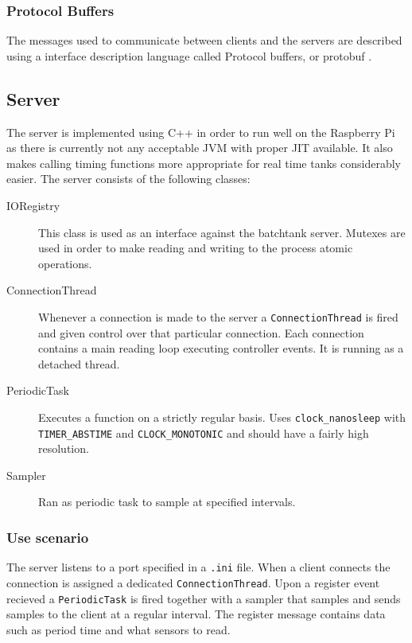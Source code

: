 \documentclass{article}
\begin{document}
\subsubsection{Protocol Buffers}
The messages used to communicate between clients and the servers are
described using a interface description language called Protocol
buffers, or protobuf \cite{protobuf}.


\subsection{Server}
The server is implemented using C++ in order to run well on the Raspberry Pi as
there is currently not any acceptable JVM with proper JIT available. It
also makes calling timing functions more appropriate for real time tanks
considerably easier. The server consists of the following classes:

\begin{description}
\item[IORegistry]
  This class is used as an interface against the batchtank server.
  Mutexes are used in order to make reading and writing to the process
  atomic operations.

\item[ConnectionThread]
  Whenever a connection is made to the server a \verb+ConnectionThread+
  is fired and given control over that particular connection. Each
  connection contains a main reading loop executing controller events.
  It is running as a detached thread.

\item[PeriodicTask]
  Executes a function on a strictly regular basis. Uses
  \verb+clock_nanosleep+  with \verb+TIMER_ABSTIME+ and
  \verb+CLOCK_MONOTONIC+ and should have a fairly high resolution.

\item[Sampler]
  Ran as periodic task to sample at specified intervals.
\end{description}

\subsubsection{Use scenario}
The server listens to a port specified in a \verb+.ini+ file. When a client
connects the connection is assigned a dedicated \verb+ConnectionThread+. 
Upon a register event recieved a \verb+PeriodicTask+ is fired together
with a sampler that samples and sends samples to the client at a regular
interval. The register message contains data such as period time and
what sensors to read.
\end{document}
